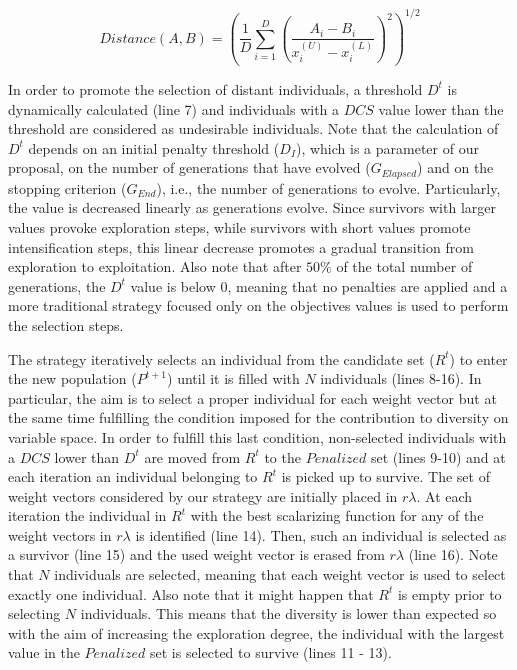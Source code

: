 \begin{equation}\label{eqn:distance}
Distance(A, B) =   \left ( \frac{1}{D}  \sum_{i=1}^D \left ( \frac{A_i - B_i}{x_i^{(U)} - x_i^{(L)}} \right )^2  \right)^{1/2}
\end{equation}

In order to promote the selection of distant individuals, a threshold $D^t$ is dynamically calculated (line 7) and 
individuals with a $DCS$ value lower than the threshold are considered as undesirable individuals.
%
Note that the calculation of $D^t$ depends on an initial penalty threshold ($D_I$), which is a parameter of our proposal,
on the number of generations that have evolved ($G_{Elapsed}$) and on the stopping criterion ($G_{End}$), i.e., the number of
generations to evolve.
%
Particularly, the value is decreased linearly as generations evolve.
%
Since survivors with larger \DCS{} values provoke exploration steps, while survivors with short \DCS{} values promote
intensification steps, this linear decrease promotes
a gradual transition from exploration to exploitation.
%
Also note that after $50\%$ of the total number of generations, the $D^t$ value is below 0, 
meaning that no penalties are applied and a more traditional strategy focused only on the objectives values
is used to perform the selection steps.

The strategy iteratively selects an individual from the candidate set ($R^t$) to enter the new population ($P^{t+1}$) until
it is filled with $N$ individuals (lines 8-16).
%
In particular, the aim is to select a proper individual for each weight vector but at the same time fulfilling
the condition imposed for the contribution to diversity on variable space.
%
In order to fulfill this last condition, non-selected individuals with a $DCS$
lower than $D^t$ are moved from $R^t$ to the $Penalized$ set (lines 9-10) and at each iteration
an individual belonging to $R^t$ is picked up to survive.
%
The set of weight vectors considered by our strategy are initially placed in $r\lambda$.
%
At each iteration the individual in $R^t$ with the best scalarizing function for any of the weight vectors in
$r\lambda$ is identified (line 14).
%
Then, such an individual is selected as a survivor (line 15) and the used weight vector is erased
from $r\lambda$ (line 16).
%
Note that $N$ individuals are selected, meaning that each weight vector is used to select exactly one individual.
%
Also note that it might happen that $R^t$ is empty prior to selecting $N$ individuals.
%
This means that the diversity is lower than expected so
with the aim of increasing the exploration degree, the individual with the largest \DCS{} value in
the $Penalized$ set is selected to survive (lines 11 - 13).
